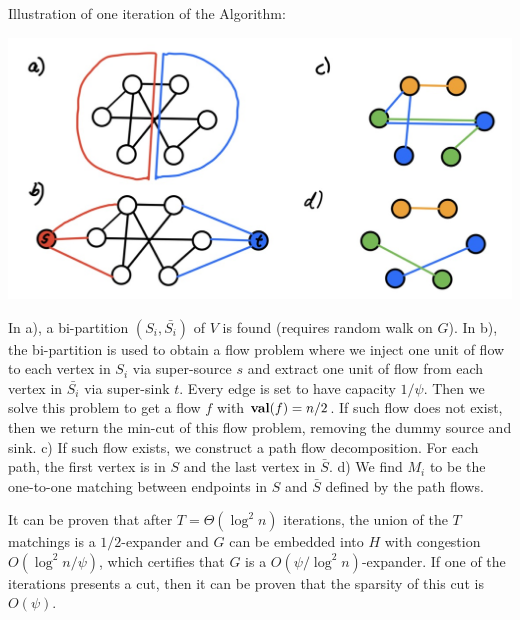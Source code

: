 Illustration of one iteration of the Algorithm:

\begin{center}
\includegraphics[width=.6\columnwidth]{imgs/cut-match.png}
\end{center}

 In a), a bi-partition $(S_i, \bar{S_i})$ of $V$ is found (requires random walk on $G$). In b), the bi-partition is used to obtain a flow problem where we inject one unit of flow to each vertex in $S_i$ via super-source $s$ and extract one unit of flow from each vertex in $\bar{S_i}$ via super-sink $t$. Every edge is set to have capacity $1/\psi$. Then we solve this problem to get a flow $f$ with $\operatorname{\textbf{val}}(f)=n/2$. If such flow does not exist, then we return the min-cut of this flow problem, removing the dummy source and sink.  c) If such flow exists, we construct a path flow decomposition. For each path, the first vertex is in $S$ and the last vertex in $\bar{S}$. d) We find $M_{i}$ to be the one-to-one matching between endpoints in $S$ and $\bar{S}$ defined by the path flows.

 It can be proven that after $T=\Theta(\log^2 n)$ iterations, the union of the $T$ matchings is a $1/2$-expander and $G$ can be embedded into $H$ with congestion $O(\log^2 n / \psi)$, which certifies that $G$ is a $O(\psi / \log^2 n)$-expander. If one of the iterations presents a cut, then it can be proven that the sparsity of this cut is $O(\psi)$.